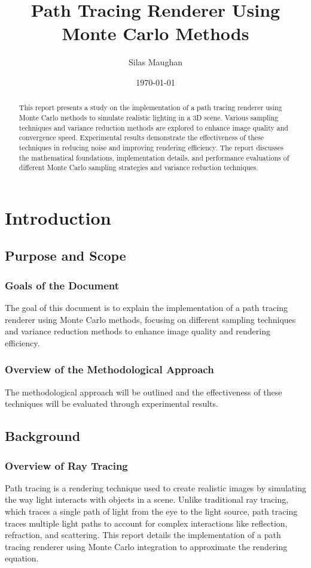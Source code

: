 \documentclass[12pt]{article}
\title{Path Tracing Renderer Using Monte Carlo Methods}
\author{Silas Maughan}
\date{\today}
\begin{document}
\maketitle

\begin{abstract}
    This report presents a study on the implementation of a path tracing renderer using Monte Carlo methods to simulate realistic lighting in a 3D scene. Various sampling techniques and variance reduction methods are explored to enhance image quality and convergence speed. Experimental results demonstrate the effectiveness of these techniques in reducing noise and improving rendering efficiency. The report discusses the mathematical foundations, implementation details, and performance evaluations of different Monte Carlo sampling strategies and variance reduction techniques.
\end{abstract}

\tableofcontents

\section{Introduction}
\label{sec:intro}
\subsection{Purpose and Scope}
\subsubsection{Goals of the Document}
The goal of this document is to explain the implementation of a path tracing renderer using Monte Carlo methods, focusing on different sampling techniques and variance reduction methods to enhance image quality and rendering efficiency.
\subsubsection{Overview of the Methodological Approach}
The methodological approach will be outlined and the effectiveness of these techniques will be evaluated through experimental results.

\subsection{Background}
\subsubsection{Overview of Ray Tracing}
Path tracing is a rendering technique used to create realistic images by simulating the way light interacts with objects in a scene. Unlike traditional ray tracing, which traces a single path of light from the eye to the light source, path tracing traces multiple light paths to account for complex interactions like reflection, refraction, and scattering. This report details the implementation of a path tracing renderer using Monte Carlo integration to approximate the rendering equation.
\end{document}
